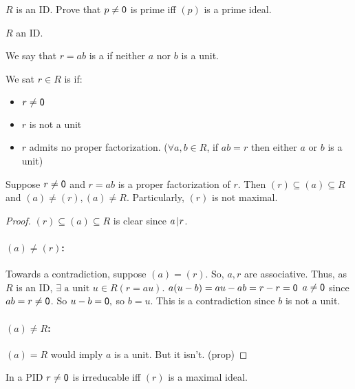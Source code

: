 \documentclass[notes.tex]{subfiles}
\begin{document}
\begin{exercise}
	$R$ is an ID. Prove that $p\ne\mathsf{0}$ is prime iff $(p)$ is a prime ideal.
\end{exercise}

$R$ an ID.

\begin{defn}
	We say that $r=ab$ is a  if neither $a$ nor $b$ is a unit.
\end{defn}

\begin{defn}
	We sat $r\in R$ is  if:
	\begin{itemize}
		\item $r\ne\mathsf{0}$
		\item $r$ is not a unit
		\item $r$ admits no proper factorization.
		($\forall a,b\in R$, if $ab = r$ then either $a$ or $b$ is a unit)
	\end{itemize}
\end{defn}

\begin{proposition}
	Suppose $r\ne\mathsf{0}$ and $r=ab$ is a proper factorization of $r$. Then $(r)\subseteq (a)\subseteq R$ and $(a) \ne (r), (a)\ne R$.
	Particularly, $(r)$ is not maximal.
\end{proposition}
\begin{proof}
	$(r)\subseteq (a)\subseteq R$ is clear since $a\mkern2mu|\mkern1mu r$.

	\paragraph{$(a)\ne (r)$:} Towards a contradiction, suppose $(a) = (r)$. So, $a,r$ are associative. Thus, as $R$ is an ID, $\exists \text{ a unit } u\in R (r=au)$.
	$a(u-b) = au-ab = r-r=\mathsf{0}$
	$a\ne \mathsf{0}$ since $ab = r \ne \mathsf{0}$. So $u-b = \mathsf{0},$ so $b=u$. This is a contradiction since $b$ is not a unit.

	\paragraph{$(a)\ne R$:} $(a) = R$ would imply $a$ is a unit. But it isn't. 
	\qedhere(prop)
\end{proof}

\begin{proposition}
	In a PID $r\ne \mathsf{0}$ is irreducable iff $(r)$ is a maximal ideal.
\end{proposition}
\end{document}
